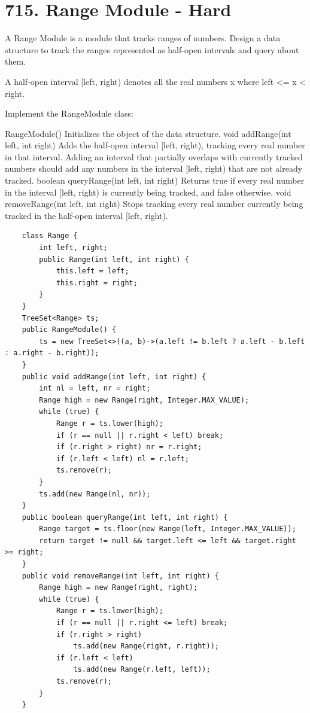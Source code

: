 \documentclass[9pt, b5paaper]{book}
\begin{document}
\section{715. Range Module - Hard}
\label{sec-8-4}
A Range Module is a module that tracks ranges of numbers. Design a data structure to track the ranges represented as half-open intervals and query about them.

A half-open interval [left, right) denotes all the real numbers x where left <= x < right.

Implement the RangeModule class:

RangeModule() Initializes the object of the data structure.
void addRange(int left, int right) Adds the half-open interval [left, right), tracking every real number in that interval. Adding an interval that partially overlaps with currently tracked numbers should add any numbers in the interval [left, right) that are not already tracked.
boolean queryRange(int left, int right) Returns true if every real number in the interval [left, right) is currently being tracked, and false otherwise.
void removeRange(int left, int right) Stops tracking every real number currently being tracked in the half-open interval [left, right).
\begin{verbatim}
    class Range {
        int left, right;
        public Range(int left, int right) {
            this.left = left;
            this.right = right;
        }
    }
    TreeSet<Range> ts;
    public RangeModule() {
        ts = new TreeSet<>((a, b)->(a.left != b.left ? a.left - b.left : a.right - b.right));
    }
    public void addRange(int left, int right) {
        int nl = left, nr = right;
        Range high = new Range(right, Integer.MAX_VALUE);
        while (true) {
            Range r = ts.lower(high);
            if (r == null || r.right < left) break;
            if (r.right > right) nr = r.right;
            if (r.left < left) nl = r.left;
            ts.remove(r);
        }
        ts.add(new Range(nl, nr));
    }
    public boolean queryRange(int left, int right) {
        Range target = ts.floor(new Range(left, Integer.MAX_VALUE));
        return target != null && target.left <= left && target.right >= right;
    }
    public void removeRange(int left, int right) {
        Range high = new Range(right, right);
        while (true) {
            Range r = ts.lower(high);
            if (r == null || r.right <= left) break;
            if (r.right > right)
                ts.add(new Range(right, r.right));
            if (r.left < left)
                ts.add(new Range(r.left, left));
            ts.remove(r);
        }
    }
\end{verbatim}
\end{document}
